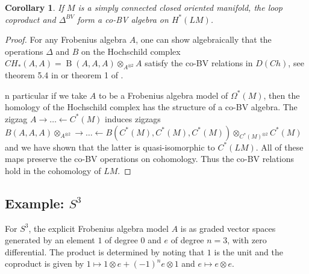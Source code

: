 \documentclass{scrartcl}
\theoremstyle{plain}
\newtheorem{corollary}[theorem]{Corollary}
\theoremstyle{definition}
\newcommand{\from}{\leftarrow}
\DeclareMathOperator{\BC}{B}
\begin{document}
\begin{corollary}
    If $M$ is a simply connected closed oriented manifold, the loop coproduct and $\Delta^{BV}$ form a co-BV algebra on $H^*(LM)$.
\end{corollary}
\begin{proof}
    For any Frobenius algebra $A$, one can show algebraically that the operations $\Delta$ and $B$ on the Hochschild complex $CH_*(A, A) = \BC(A, A, A)\otimes_{A^{\otimes 2}} A$ satisfy the co-BV relations in $D(Ch)$, see theorem 5.4 in \cite{abbaspour2015algebraic} or theorem 1 of \cite{tradler2008bvalg}.

    n particular if we take $A$ to be a Frobenius algebra model of $\Omega^*(M)$, then the homology of the Hochschild complex has the structure of a co-BV algebra. The zigzag $A\to\dots\from C^*(M)$ induces zigzags $B(A, A, A)\otimes_{A^{\otimes 2}} \to\dots\from B(C^*(M),C^*(M), C^*(M))\otimes_{C^*(M)^{\otimes 2}} C^*(M)$ and we have shown that the latter is quasi-isomorphic to $C^*(LM)$. All of these maps preserve the co-BV operations on cohomology. Thus the co-BV relations hold in the cohomology of $LM$. 
\end{proof}


\subsection[Example: The three-dimensional Sphere]{Example: $S^3$}

For $S^3$, the explicit Frobenius algebra model $A$ is as graded vector spaces generated by an element $1$ of degree $0$ and $e$ of degree $n=3$, with zero differential. The product is determined by noting that $1$ is the unit and the coproduct is given by $1\mapsto 1\otimes e + (-1)^n e\otimes 1$ and $e\mapsto e\otimes e$. 
\end{document}
